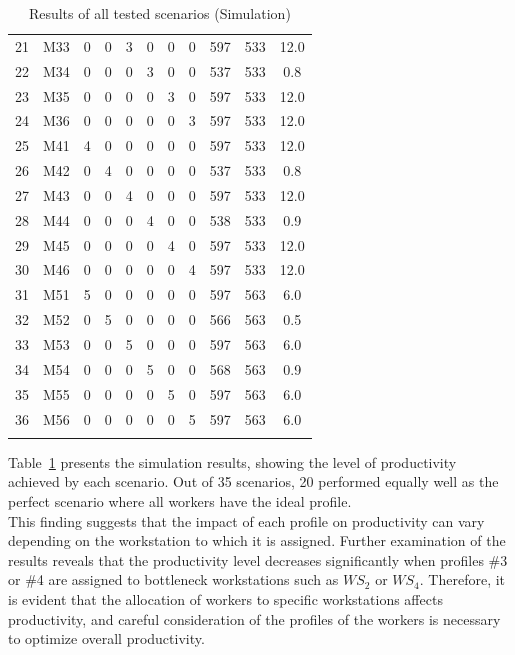 \documentclass[review,12pt, 3p, times]{elsarticle}
\begin{document}
\begin{table}[htbp]
\begin{center}
\begin{longtable}{cc|cccccc|ccc|}
			21 & M33 & 0 & 0 & 3 & 0 & 0 & 0 & 597 & 533 & 12.0 \\
			22 & M34 & 0 & 0 & 0 & 3 & 0 & 0 & 537 & 533 & 0.8  \\
			23 & M35 & 0 & 0 & 0 & 0 & 3 & 0 & 597 & 533 & 12.0 \\
			24 & M36 & 0 & 0 & 0 & 0 & 0 & 3 & 597 & 533 & 12.0 \\
			\hline
			25 & M41 & 4 & 0 & 0 & 0 & 0 & 0 & 597 & 533 & 12.0 \\
			26 & M42 & 0 & 4 & 0 & 0 & 0 & 0 & 537 & 533 & 0.8  \\
			27 & M43 & 0 & 0 & 4 & 0 & 0 & 0 & 597 & 533 & 12.0 \\
			28 & M44 & 0 & 0 & 0 & 4 & 0 & 0 & 538 & 533 & 0.9  \\
			29 & M45 & 0 & 0 & 0 & 0 & 4 & 0 & 597 & 533 & 12.0 \\
			30 & M46 & 0 & 0 & 0 & 0 & 0 & 4 & 597 & 533 & 12.0 \\
			\hline
			31 & M51 & 5 & 0 & 0 & 0 & 0 & 0 & 597 & 563 & 6.0  \\
			32 & M52 & 0 & 5 & 0 & 0 & 0 & 0 & 566 & 563 & 0.5  \\
			33 & M53 & 0 & 0 & 5 & 0 & 0 & 0 & 597 & 563 & 6.0  \\
			34 & M54 & 0 & 0 & 0 & 5 & 0 & 0 & 568 & 563 & 0.9  \\
			35 & M55 & 0 & 0 & 0 & 0 & 5 & 0 & 597 & 563 & 6.0  \\
			36 & M56 & 0 & 0 & 0 & 0 & 0 & 5 & 597 & 563 & 6.0  \\
			\hline
            \\
		\end{longtable}
            
		\caption{Results of all tested scenarios (Simulation)}
		\label{tab:t0}
	\end{center}

\end{table}
	
Table~\ref{tab:t0} presents the simulation results, showing the level of productivity achieved by each scenario. Out of 35 scenarios, 20 performed equally well as the perfect scenario where all workers have the ideal profile.
\\
This finding suggests that the impact of each profile on productivity can vary depending on the workstation to which it is assigned. Further examination of the results reveals that the productivity level decreases significantly when profiles \#3 or \#4 are assigned to bottleneck workstations such as $\textit{WS}_2$ or $\textit{WS}_4$. Therefore, it is evident that the allocation of workers to specific workstations affects productivity, and careful consideration of the profiles of the workers is necessary to optimize overall productivity.
	
\end{document}
